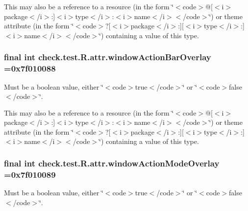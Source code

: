 This may also be a reference to a resource (in the form \char`\"{}$<$code$>$@\mbox{[}$<$i$>$package$<$/i$>$\+:\mbox{]}$<$i$>$type$<$/i$>$\+:$<$i$>$name$<$/i$>$$<$/code$>$\char`\"{}) or theme attribute (in the form \char`\"{}$<$code$>$?\mbox{[}$<$i$>$package$<$/i$>$\+:\mbox{]}\mbox{[}$<$i$>$type$<$/i$>$\+:\mbox{]}$<$i$>$name$<$/i$>$$<$/code$>$\char`\"{}) containing a value of this type. \hypertarget{classcheck_1_1test_1_1_r_1_1attr_a19fa3f87e323234548344c5e54c84a14}{}
\subsubsection[{window\+Action\+Bar\+Overlay}]{\setlength{\rightskip}{0pt plus 5cm}final int check.\+test.\+R.\+attr.\+window\+Action\+Bar\+Overlay =0x7f010088\hspace{0.3cm}{\ttfamily [static]}}\label{classcheck_1_1test_1_1_r_1_1attr_a19fa3f87e323234548344c5e54c84a14}
Must be a boolean value, either \char`\"{}$<$code$>$true$<$/code$>$\char`\"{} or \char`\"{}$<$code$>$false$<$/code$>$\char`\"{}. 

This may also be a reference to a resource (in the form \char`\"{}$<$code$>$@\mbox{[}$<$i$>$package$<$/i$>$\+:\mbox{]}$<$i$>$type$<$/i$>$\+:$<$i$>$name$<$/i$>$$<$/code$>$\char`\"{}) or theme attribute (in the form \char`\"{}$<$code$>$?\mbox{[}$<$i$>$package$<$/i$>$\+:\mbox{]}\mbox{[}$<$i$>$type$<$/i$>$\+:\mbox{]}$<$i$>$name$<$/i$>$$<$/code$>$\char`\"{}) containing a value of this type. \hypertarget{classcheck_1_1test_1_1_r_1_1attr_a29b4d3e415a1c7f9c6528fc82443932a}{}
\subsubsection[{window\+Action\+Mode\+Overlay}]{\setlength{\rightskip}{0pt plus 5cm}final int check.\+test.\+R.\+attr.\+window\+Action\+Mode\+Overlay =0x7f010089\hspace{0.3cm}{\ttfamily [static]}}\label{classcheck_1_1test_1_1_r_1_1attr_a29b4d3e415a1c7f9c6528fc82443932a}
Must be a boolean value, either \char`\"{}$<$code$>$true$<$/code$>$\char`\"{} or \char`\"{}$<$code$>$false$<$/code$>$\char`\"{}. 


